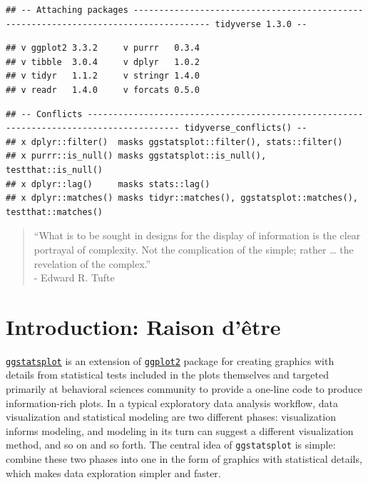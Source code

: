 \documentclass[
]{article}
\begin{document}
\begin{verbatim}
## -- Attaching packages ------------------------------------------------------------------------------------- tidyverse 1.3.0 --
\end{verbatim}

\begin{verbatim}
## v ggplot2 3.3.2     v purrr   0.3.4
## v tibble  3.0.4     v dplyr   1.0.2
## v tidyr   1.1.2     v stringr 1.4.0
## v readr   1.4.0     v forcats 0.5.0
\end{verbatim}

\begin{verbatim}
## -- Conflicts ---------------------------------------------------------------------------------------- tidyverse_conflicts() --
## x dplyr::filter()  masks ggstatsplot::filter(), stats::filter()
## x purrr::is_null() masks ggstatsplot::is_null(), testthat::is_null()
## x dplyr::lag()     masks stats::lag()
## x dplyr::matches() masks tidyr::matches(), ggstatsplot::matches(), testthat::matches()
\end{verbatim}

\begin{quote}
``What is to be sought in designs for the display of information is the clear
portrayal of complexity. Not the complication of the simple; rather \ldots{} the
revelation of the complex.''\\
- Edward R. Tufte
\end{quote}

\hypertarget{introduction-raison-duxeatre}{%
\section{Introduction: Raison d'être}\label{introduction-raison-duxeatre}}

\href{https://indrajeetpatil.github.io/ggstatsplot/}{\texttt{ggstatsplot}} is an extension
of \href{https://github.com/tidyverse/ggplot2}{\texttt{ggplot2}} package for creating
graphics with details from statistical tests included in the plots themselves
and targeted primarily at behavioral sciences community to provide a one-line
code to produce information-rich plots. In a typical exploratory data analysis
workflow, data visualization and statistical modeling are two different phases:
visualization informs modeling, and modeling in its turn can suggest a
different visualization method, and so on and so forth. The central idea of
\texttt{ggstatsplot} is simple: combine these two phases into one in the form of
graphics with statistical details, which makes data exploration simpler and
faster.
\end{document}
